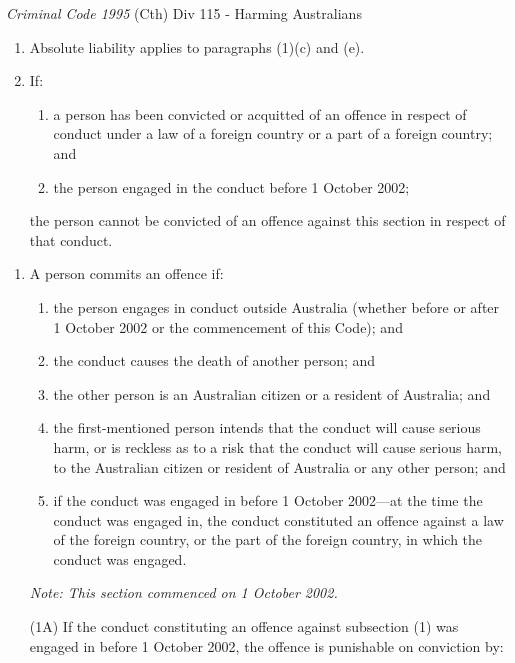 \begin{statutedetails}{\textit{Criminal Code 1995} (Cth) Div 115 - Harming Australians}
\begin{enumerate}[label=(\arabic*)]
        \item Absolute liability applies to paragraphs (1)(c) and (e).
        \item If:
        \begin{enumerate}[label=(\alph*)]
            \item a person has been convicted or acquitted of an offence in respect of conduct under a law of a foreign country or a part of a foreign country; and
            \item the person engaged in the conduct before 1 October 2002;
        \end{enumerate}
        the person cannot be convicted of an offence against this section in respect of that conduct.
    \end{enumerate}

    \begin{enumerate}[label=(\arabic*)]
        \item A person commits an offence if:
        \begin{enumerate}[label=(\alph*)]
            \item the person engages in conduct outside Australia (whether before or after 1 October 2002 or the commencement of this Code); and
            \item the conduct causes the death of another person; and
            \item the other person is an Australian citizen or a resident of Australia; and
            \item the first-mentioned person intends that the conduct will cause serious harm, or is reckless as to a risk that the conduct will cause serious harm, to the Australian citizen or resident of Australia or any other person; and
            \item if the conduct was engaged in before 1 October 2002—at the time the conduct was engaged in, the conduct constituted an offence against a law of the foreign country, or the part of the foreign country, in which the conduct was engaged.
        \end{enumerate}
        \par \textit{Note: This section commenced on 1 October 2002.}
        \item[(1A)] If the conduct constituting an offence against subsection (1) was engaged in before 1 October 2002, the offence is punishable on conviction by:
        \begin{enumerate}[label=(\alph*)]

\end{enumerate}
\end{enumerate}
\end{statutedetails}
